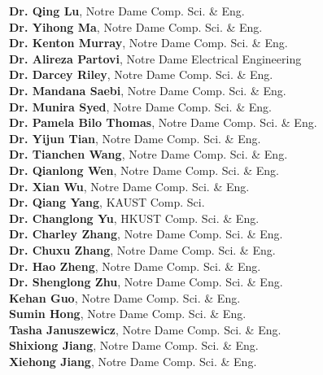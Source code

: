 \documentclass[10pt]{article}
\newenvironment{myindentpar}[1]%
{\begin{list}{}%
         {\setlength{\leftmargin}{#1}}%
         \item[]%
}
{\end{list}}
\newcounter{list}
\begin{document}
\begin{myindentpar}{0.75cm}
{\textcolor{white}{.}{\bf Dr. Qing Lu}, Notre Dame Comp. Sci. \& Eng. \\
\textcolor{white}{.}{\bf Dr. Yihong Ma}, Notre Dame Comp. Sci. \& Eng. \\
\textcolor{white}{.}{\bf Dr. Kenton Murray}, Notre Dame Comp. Sci. \& Eng. \\
\textcolor{white}{.}{\bf Dr. Alireza Partovi}, Notre Dame Electrical Engineering \\
\textcolor{white}{.}{\bf Dr. Darcey Riley}, Notre Dame Comp. Sci. \& Eng. \\
\textcolor{white}{.}{\bf Dr. Mandana Saebi}, Notre Dame Comp. Sci. \& Eng. \\
\textcolor{white}{.}{\bf Dr. Munira Syed}, Notre Dame Comp. Sci. \& Eng. \\
\textcolor{white}{.}{\bf Dr. Pamela Bilo Thomas}, Notre Dame Comp. Sci. \& Eng. \\
\textcolor{white}{.}{\bf Dr. Yijun Tian}, Notre Dame Comp. Sci. \& Eng. \\
\textcolor{white}{.}{\bf Dr. Tianchen Wang}, Notre Dame Comp. Sci. \& Eng. \\
\textcolor{white}{.}{\bf Dr. Qianlong Wen}, Notre Dame Comp. Sci. \& Eng. \\
\textcolor{white}{.}{\bf Dr. Xian Wu}, Notre Dame Comp. Sci. \& Eng. \\
\textcolor{white}{.}{\bf Dr. Qiang Yang}, KAUST Comp. Sci. \\
\textcolor{white}{.}{\bf Dr. Changlong Yu}, HKUST Comp. Sci. \& Eng. \\
\textcolor{white}{.}{\bf Dr. Charley Zhang}, Notre Dame Comp. Sci. \& Eng. \\
\textcolor{white}{.}{\bf Dr. Chuxu Zhang}, Notre Dame Comp. Sci. \& Eng. \\
\textcolor{white}{.}{\bf Dr. Hao Zheng}, Notre Dame Comp. Sci. \& Eng. \\
\textcolor{white}{.}{\bf Dr. Shenglong Zhu}, Notre Dame Comp. Sci. \& Eng. \\
\textcolor{white}{.}{\bf Kehan Guo}, Notre Dame Comp. Sci. \& Eng. \\
\textcolor{white}{.}{\bf Sumin Hong}, Notre Dame Comp. Sci. \& Eng. \\
\textcolor{white}{.}{\bf Tasha Januszewicz}, Notre Dame Comp. Sci. \& Eng. \\
\textcolor{white}{.}{\bf Shixiong Jiang}, Notre Dame Comp. Sci. \& Eng. \\
\textcolor{white}{.}{\bf Xiehong Jiang}, Notre Dame Comp. Sci. \& Eng. \\
}
\end{myindentpar}
\end{document}
